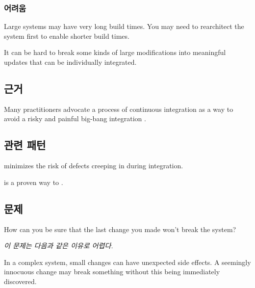 \documentclass[a4paper,10pt,twoside]{book}
\begin{document}
\subsubsection*{어려움}

\begin{bulletlist}
\item Large systems may have very long build times. You may need to rearchitect the system first to enable shorter build times.

\item It can be hard to break some kinds of large modifications into meaningful updates that can be individually integrated. 
\end{bulletlist}

\subsection*{근거}

Many practitioners advocate a process of continuous integration as a way to avoid a risky and painful big-bang integration \cite{Booc94a}.

\subsection*{관련 패턴}

 minimizes the risk of defects creeping in during integration. 

 \cite{Booc94a} \cite{Beck00a} is a proven way to .




\subsection*{문제}

How can you be sure that the last change you made won't break the system?

\emph{이 문제는 다음과 같은 이유로 어렵다.}

\begin{bulletlist}
\item In a complex system, small changes can have unexpected side effects. A seemingly innocuous change may break something without this being immediately discovered.
\end{bulletlist}
\end{document}
